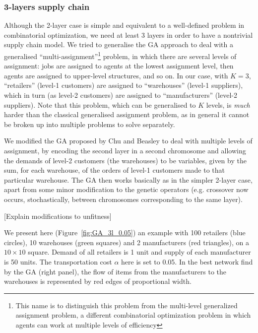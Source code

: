 \documentclass[12pt,titlepage]{article}
\begin{document}
\subsubsection*{3-layers supply chain}

Although the 2-layer case is simple and equivalent to a well-defined problem in combinatorial optimization, we need at least 3 layers in order to have a nontrivial supply chain model. We tried to generalise the GA approach to deal with a generalised ``multi-assignment''\footnote{This name is to distinguish this problem from the multi-level generalized assignment problem, a different combinatorial optimization problem in which agents can work at multiple levels of efficiency} problem, in which there are several levels of assignment: jobs are assigned to agents at the lowest assignment level, then agents are assigned to upper-level structures, and so on. In our case, with $K=3$, ``retailers'' (level-1 customers) are assigned to  ``warehouses'' (level-1 suppliers), which in turn (as level-2 customers) are assigned to ``manufacturers'' (level-2 suppliers). Note that this problem, which can be generalised to $K$ levels, is \emph{much} harder than the classical generalised assignment problem, as in general it cannot be broken up into multiple problems to solve separately.

We modified the GA proposed by Chu and Beasley to deal with multiple levels of assignment, by encoding the second layer in a second chromosome and allowing the demands of level-2 customers (the warehouses) to be variables, given by the sum, for each warehouse, of the orders of level-1 customers made to that particular warehouse. The GA then works basically as in the simpler 2-layer case, apart from some minor modification to the genetic operators (e.g. crossover now occurs, stochastically, between chromosomes corresponding to the same layer).

[Explain modifications to unfitness]

We present here (Figure~\ref{fig:GA_3l_0.05}) an example with 100 retailers (blue circles), 10 warehouses (green squares) and 2 manufacturers (red triangles), on a $10 \times 10$ square. Demand of all retailers is 1 unit and supply of each manufacturer is 50 units. The transportation cost $\alpha$ here is set to 0.05. In the best network find by the GA (right panel), the flow of items from the manufacturers to the warehouses is represented by red edges of proportional width.
\end{document}
